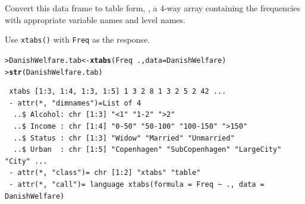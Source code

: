 \documentclass[10pt]{report}\usepackage[]{graphicx}\usepackage[]{color}
\makeatletter
\newcommand{\hlopt}[1]{\textcolor[rgb]{0,0,0}{#1}}%
\newcommand{\hlstd}[1]{\textcolor[rgb]{0.345,0.345,0.345}{#1}}%
\newcommand{\hlkwb}[1]{\textcolor[rgb]{0.69,0.353,0.396}{#1}}%
\newcommand{\hlkwc}[1]{\textcolor[rgb]{0.333,0.667,0.333}{#1}}%
\newcommand{\hlkwd}[1]{\textcolor[rgb]{0.737,0.353,0.396}{\textbf{#1}}}%
\newenvironment{kframe}{%
 \def\at@end@of@kframe{}%
 \ifinner\ifhmode%
  \def\at@end@of@kframe{\end{minipage}}%
  \begin{minipage}{\columnwidth}%
 \fi\fi%
 \def\FrameCommand##1{\hskip\@totalleftmargin \hskip-\fboxsep
 \colorbox{shadecolor}{##1}\hskip-\fboxsep
     \hskip-\linewidth \hskip-\@totalleftmargin \hskip\columnwidth}%
 \MakeFramed {\advance\hsize-\width
   \@totalleftmargin\z@ \linewidth\hsize
   \@setminipage}}%
 {\par\unskip\endMakeFramed%
 \at@end@of@kframe}
\newenvironment{knitrout}{}{} %
\renewenvironment{knitrout}{\small\renewcommand{\baselinestretch}{.85}}{} %
\makeatother
\begin{document}
\begin{Exercises}
\begin{enumerate*}
    \item Convert this data frame to table form, ,
    a 4-way array containing the
    frequencies with appropriate variable names and level names.
    \begin{ans}
      Use \texttt{xtabs()} with \texttt{Freq} as the response.
      
\begin{knitrout}\footnotesize
{}\color{fgcolor}\begin{kframe}
\begin{alltt}
\hlstd{> }\hlstd{DanishWelfare.tab} \hlkwb{<-}\hlkwd{xtabs}\hlstd{(Freq} \hlopt{~} \hlstd{.,} \hlkwc{data} \hlstd{= DanishWelfare)}
\hlstd{> }\hlkwd{str}\hlstd{(DanishWelfare.tab)}
\end{alltt}
\begin{verbatim}
 xtabs [1:3, 1:4, 1:3, 1:5] 1 3 2 8 1 3 2 5 2 42 ...
 - attr(*, "dimnames")=List of 4
  ..$ Alcohol: chr [1:3] "<1" "1-2" ">2"
  ..$ Income : chr [1:4] "0-50" "50-100" "100-150" ">150"
  ..$ Status : chr [1:3] "Widow" "Married" "Unmarried"
  ..$ Urban  : chr [1:5] "Copenhagen" "SubCopenhagen" "LargeCity" "City" ...
 - attr(*, "class")= chr [1:2] "xtabs" "table"
 - attr(*, "call")= language xtabs(formula = Freq ~ ., data = DanishWelfare)
\end{verbatim}
\end{kframe}
\end{knitrout}
    \end{ans}
    

\end{enumerate*}
\end{Exercises}
\end{document}
